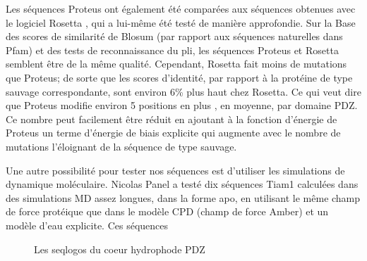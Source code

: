 Les séquences Proteus ont également été comparées aux séquences obtenues avec le logiciel Rosetta , qui a lui-même été testé de manière approfondie. Sur la Base des scores de similarité de Blosum (par rapport aux séquences naturelles dans Pfam) et des tests de reconnaissance du pli, les séquences Proteus et Rosetta semblent être de la même qualité. Cependant, Rosetta fait moins de mutations que Proteus; de sorte que les scores d'identité, par rapport à la protéine de type sauvage correspondante, sont environ 6\%  plus haut chez Rosetta. Ce qui veut dire que Proteus modifie environ 5 positions en plus , en moyenne, par domaine PDZ. Ce nombre peut facilement être réduit en ajoutant à la fonction d'énergie de Proteus un terme  d'énergie de biais explicite qui augmente avec le nombre de mutations l'éloignant de la séquence de type sauvage. 

Une autre possibilité pour tester nos séquences  est d'utiliser les simulations de dynamique moléculaire. Nicolas Panel a testé dix séquences Tiam1 calculées dans des simulations MD assez longues, dans la forme apo, en utilisant le même champ de force protéique que dans le modèle CPD (champ de force Amber) et un modèle d'eau explicite. Ces séquences 

   \begin{figure}[t]
     \caption{Les seqlogos du coeur hydrophode PDZ}
\label{graph:corePDZ}
   \end{figure}

